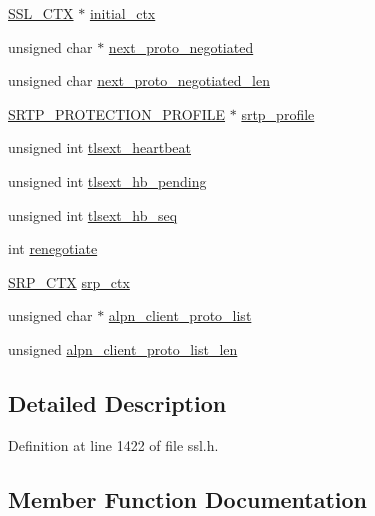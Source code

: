 \begin{DoxyCompactItemize}
\hyperlink{crypto_2ossl__typ_8h_a1a21892c1193ee6eb572c2c72d3924ca}{S\+S\+L\+\_\+\+C\+TX} $\ast$ \hyperlink{structssl__st_a60b05fcdf0e0ca5b4e3db0330849efbb}{initial\+\_\+ctx}
\item 
unsigned char $\ast$ \hyperlink{structssl__st_a566878646e012f8be2f5c38db4137638}{next\+\_\+proto\+\_\+negotiated}
\item 
unsigned char \hyperlink{structssl__st_a9a74ebef7862211bb268b1d2b944a9b7}{next\+\_\+proto\+\_\+negotiated\+\_\+len}
\item 
\hyperlink{include_2openssl_2ssl_8h_ad71374b5a3df5292d0722b703841292e}{S\+R\+T\+P\+\_\+\+P\+R\+O\+T\+E\+C\+T\+I\+O\+N\+\_\+\+P\+R\+O\+F\+I\+LE} $\ast$ \hyperlink{structssl__st_a43d86efb97ae5e83204ea6362f97ad8d}{srtp\+\_\+profile}
\item 
unsigned int \hyperlink{structssl__st_a3a59f3296ac282fb5a85097662200982}{tlsext\+\_\+heartbeat}
\item 
unsigned int \hyperlink{structssl__st_a3f9406b42169b3525ce4290aac484273}{tlsext\+\_\+hb\+\_\+pending}
\item 
unsigned int \hyperlink{structssl__st_aebe5f879f3e7848dd03f78ab2b489a78}{tlsext\+\_\+hb\+\_\+seq}
\item 
int \hyperlink{structssl__st_a33239609244fa68ad9876fb8a7c05917}{renegotiate}
\item 
\hyperlink{include_2openssl_2ssl_8h_aed13ca5c0b6c032c4fb830dea5e80b55}{S\+R\+P\+\_\+\+C\+TX} \hyperlink{structssl__st_ad3a544f7f1590f59a020f91dbd13ee09}{srp\+\_\+ctx}
\item 
unsigned char $\ast$ \hyperlink{structssl__st_a00a194ca684c082b9a17288427f3aff9}{alpn\+\_\+client\+\_\+proto\+\_\+list}
\item 
unsigned \hyperlink{structssl__st_aad86abbbccbac1d4f14e4307727e3752}{alpn\+\_\+client\+\_\+proto\+\_\+list\+\_\+len}
\end{DoxyCompactItemize}


\subsection{Detailed Description}


Definition at line 1422 of file ssl.\+h.



\subsection{Member Function Documentation}
